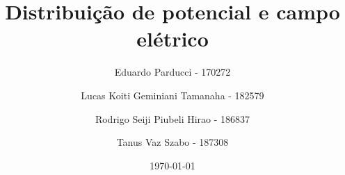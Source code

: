 \title{Distribuição de potencial e campo elétrico}
\author{
    Eduardo Parducci - 170272
    \and
    Lucas Koiti Geminiani Tamanaha - 182579
    \and
    Rodrigo Seiji Piubeli Hirao - 186837
    \and
    Tanus Vaz Szabo - 187308
}
\date{\today}